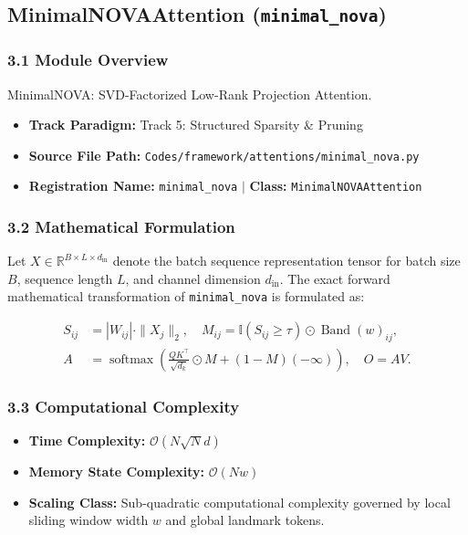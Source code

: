 \subsection{MinimalNOVAAttention (\texttt{minimal\_nova})}
\label{sec:app_module_minimal_nova}

\subsubsection*{3.1 Module Overview}
MinimalNOVA: SVD-Factorized Low-Rank Projection Attention.
\begin{itemize}
    \item \textbf{Track Paradigm:} Track 5: Structured Sparsity \& Pruning
    \item \textbf{Source File Path:} \texttt{Codes/framework/attentions/minimal\_nova.py}
    \item \textbf{Registration Name:} \texttt{minimal\_nova} $\mid$ \textbf{Class:} \texttt{MinimalNOVAAttention}
\end{itemize}

\subsubsection*{3.2 Mathematical Formulation}
Let $X \in \mathbb{R}^{B \times L \times d_{\text{in}}}$ denote the batch sequence representation tensor for batch size $B$, sequence length $L$, and channel dimension $d_{\text{in}}$. The exact forward mathematical transformation of \texttt{minimal\_nova} is formulated as:

\begin{align}
S_{ij} &= |W_{ij}| \cdot \|X_j\|_2, \quad M_{ij} = \mathbb{I}(S_{ij} \ge \tau) \odot \operatorname{Band}(w)_{ij}, \\
A &= \operatorname{softmax}\left(\frac{Q K^\top}{\sqrt{d_k}} \odot M + (1 - M)(-\infty)\right), \quad O = A V.
\end{align}


\subsubsection*{3.3 Computational Complexity}
\begin{itemize}
    \item \textbf{Time Complexity:} $\mathcal{O}(N \sqrt{N} d)$
    \item \textbf{Memory State Complexity:} $\mathcal{O}(N w)$
    \item \textbf{Scaling Class:} Sub-quadratic computational complexity governed by local sliding window width $w$ and global landmark tokens.
\end{itemize}


